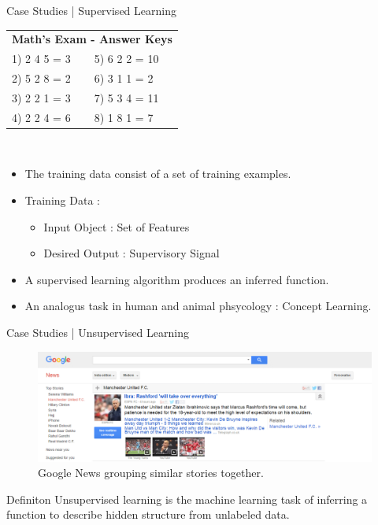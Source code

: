 \documentclass[10pt]{beamer}
\begin{document}
			\begin{frame}{Case Studies | Supervised Learning}
				\begin{center}
					\begin{tabular}{|l l|}\hline 
						\multicolumn{2}{|c|}{\textbf{Math's Exam - Answer Keys}}\\
						1) 2  4  5 = 3 & 5) 6  2  2 = 10 \\ 
						2) 5  2  8 = 2 & 6) 3  1  1 = 2  \\ 
						3) 2  2  1 = 3 & 7) 5  3  4 = 11 \\ 
						4) 2  2  4 = 6 & 8) 1  8  1 = 7  \\ \hline
					\end{tabular}\\
					\bigskip
					\begin{itemize}
						\item The training data consist of a set of training examples.
						\item Training Data :
							\begin{itemize}
								\item Input Object : Set of Features
								\item Desired Output : Supervisory Signal
							\end{itemize}
						\item A supervised learning algorithm produces an inferred function.
						\item An analogus task in human and animal phsycology : Concept Learning.
					\end{itemize}
				\end{center}
			\end{frame}
			\begin{frame}{Case Studies | Unsupervised Learning}
				\begin{center}
					\begin{figure}
					\centering
					\includegraphics[width=\linewidth]{images/unsupl-ex}
					\caption{Google News grouping similar stories together.}
					\end{figure}
					\begin{block}{Definiton}
						Unsupervised learning is the machine learning task of inferring a function to describe hidden structure from unlabeled data.
					\end{block}
				\end{center}
			\end{frame}
\end{document}
